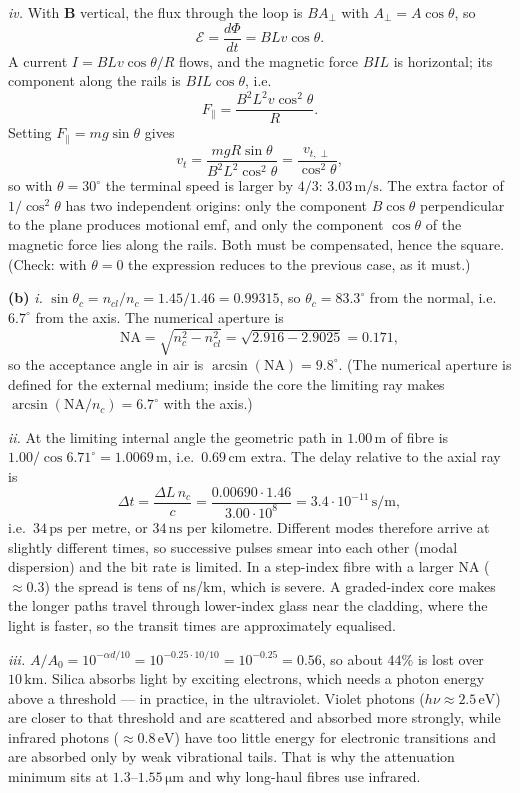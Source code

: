 \documentclass[11pt,a4paper]{article}
\newcommand{\unit}[1]{\,\mathrm{#1}}
\begin{document}
\emph{iv.} With $\mathbf B$ vertical, the flux through the loop is
$BA_\perp$ with $A_\perp=A\cos\theta$, so
\[
  \mathcal{E}=\frac{d\Phi}{dt}=BLv\cos\theta . \tag{$\ast$}
\]
A current $I=BLv\cos\theta/R$ flows, and the magnetic force
$BIL$ is horizontal; its component along the rails is $BIL\cos\theta$, i.e.
\[
  F_{\parallel}=\frac{B^2L^2v\cos^2\theta}{R}.
\]
Setting $F_{\parallel}=mg\sin\theta$ gives
\[
  v_t=\frac{mgR\sin\theta}{B^2L^2\cos^2\theta}
  =\frac{v_{t,\perp}}{\cos^2\theta},
\]
so with $\theta=30^\circ$ the terminal speed is larger by $4/3$:
$\boxed{3.03\unit{m/s}}$. The extra factor of $1/\cos^2\theta$ has two
independent origins: only the component $B\cos\theta$ perpendicular to the
plane produces motional emf, and only the component $\cos\theta$ of the
magnetic force lies along the rails. Both must be compensated, hence the
square. (Check: with $\theta=0$ the expression reduces to the previous
case, as it must.)

\textbf{(b)} \emph{i.}
$\sin\theta_c=n_{cl}/n_c=1.45/1.46=0.99315$, so
$\theta_c=83.3^\circ$ from the normal, i.e.\ $6.7^\circ$ from the axis.
The numerical aperture is
\[
  \mathrm{NA}=\sqrt{n_c^2-n_{cl}^2}=\sqrt{2.916-2.9025}=0.171,
\]
so the acceptance angle in air is $\arcsin(\mathrm{NA})=9.8^\circ$. (The
numerical aperture is defined for the external medium; inside the core the
limiting ray makes $\arcsin(\mathrm{NA}/n_c)=6.7^\circ$ with the axis.)

\emph{ii.} At the limiting internal angle the geometric path in
$1.00\unit{m}$ of fibre is $1.00/\cos6.71^\circ=1.0069\unit{m}$, i.e.\
$0.69\unit{cm}$ extra. The delay relative to the axial ray is
\[
  \Delta t=\frac{\Delta L\,n_c}{c}
  =\frac{0.00690\cdot1.46}{3.00\cdot10^{8}}
  =\boxed{3.4\cdot10^{-11}\unit{s/m}},
\]
i.e.\ $34\unit{ps}$ per metre, or $34\unit{ns}$ per kilometre. Different
modes therefore arrive at slightly different times, so successive pulses
smear into each other (modal dispersion) and the bit rate is limited. In a
step-index fibre with a larger NA ($\approx0.3$) the spread is tens of
ns/km, which is severe. A graded-index core makes the longer paths travel through
lower-index glass near the cladding, where the light is faster, so the
transit times are approximately equalised.

\emph{iii.} $A/A_0=10^{-\alpha d/10}=10^{-0.25\cdot10/10}=10^{-0.25}
=\boxed{0.56}$, so about $44\%$ is lost over $10\unit{km}$. Silica
absorbs light by exciting electrons, which needs a photon energy above a
threshold --- in practice, in the ultraviolet. Violet photons ($h\nu
\approx2.5\unit{eV}$) are closer to that threshold and are scattered and
absorbed more strongly, while infrared photons ($\approx0.8\unit{eV}$) have
too little energy for electronic transitions and are absorbed only by weak
vibrational tails. That is why the attenuation minimum sits at
$1.3$--$1.55\unit{\mu m}$ and why long-haul fibres use infrared.
\end{document}
